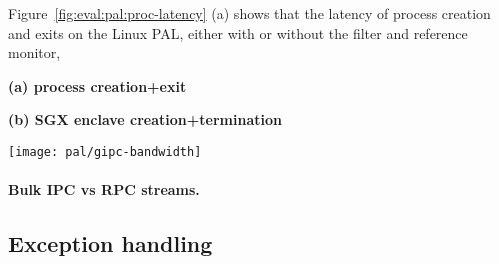 Figure~\ref{fig:eval:pal:proc-latency} (a)
shows that the latency of process creation and exits on the Linux PAL, either with or without the \seccomp{} filter and reference monitor,
 


\begin{figure*}[t!]
\centering
\footnotesize
{}
\parbox{0.59\textwidth}{\centering\bf (a) process creation+exit}
\parbox{0.39\textwidth}{\centering\bf (b) SGX enclave creation+termination}
\caption{Latency of creating (a) a clean process on the Linux PAL, and (b) an enclave on the SGX PAL, in respect of different enclave sizes.
The comparison is between (1) a combination of  and 'ing a minimal static program on Linux; (2)  on the Linux PAL, with and without a \seccomp{} filter ({\bf +SC}) and reference monitor ({\bf +RM}); (3) the same \hostapi{} on the SGX PAL.}
\label{fig:eval:pal:proc-latency}
\end{figure*}





\begin{figure*}[t!]
\centering
\footnotesize
\texttt{[image: pal/gipc-bandwidth]}
\caption{Bandwidth of sending large messages over (a) RPC streams and (b) Bulk IPC channels. The messages are sent in different sizes (1MB to 256MB), and either aligned or unaligned with the page boundary.
Higher is better. Both abstractions are benchmarked on Linux kernel 3.19 and 4.10 as the hosts. The impact of the \seccomp{} filter or reference monitor is marginal (less than 1\%).}
\label{fig:eval:pal:gipc-bandwidth}
\end{figure*}


\paragraph{Bulk IPC vs RPC streams.}




\subsection{Exception handling}


\begin{figure*}[t!]
\centering
\footnotesize
{}
\caption{Latency of (a) installing an exception handler; (b)
interrupting a running thread with signals (on Linux) or  on the PALs; (c) catching a memory protection fault. Lower is better. The comparison is between (1) signals on Linux; (2) the Linux PAL, with and without a \seccomp{} filter ({\bf +SC}) and reference monitor ({\bf +RM}); (3) the SGX PAL.}
\label{fig:eval:pal:sig-latency}
\end{figure*}